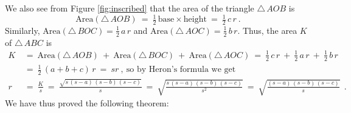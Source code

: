 
We also see from Figure \ref{fig:inscribed} that the area of the triangle $\triangle\,AOB$ is
\begin{displaymath}
 \text{Area}(\triangle\,AOB) ~=~ \tfrac{1}{2}\,\text{base} \times \text{height} ~=~
  \tfrac{1}{2}\,c\,r ~.
\end{displaymath}
Similarly, $\text{Area}(\triangle\,BOC) = \frac{1}{2}\,a\,r$ and
$\text{Area}(\triangle\,AOC) = \frac{1}{2}\,b\,r$.
Thus, the area $K$ of $\triangle\,ABC$ is
\begin{align*}
 K ~&=~ \text{Area}(\triangle\,AOB) ~+~\text{Area}(\triangle\,BOC) ~+~ \text{Area}(\triangle\,AOC)
  ~=~ \tfrac{1}{2}\,c\,r ~+~ \tfrac{1}{2}\,a\,r ~+~ \tfrac{1}{2}\,b\,r\\
 &=~ \tfrac{1}{2}\,(a+b+c)\,r ~=~ sr ~,~\text{so by Heron's formula we get}\\
 r ~&=~ \frac{K}{s} ~=~ \frac{\sqrt{s\,(s-a)\,(s-b)\,(s-c)}}{s} ~=~
  \sqrt{\frac{s\,(s-a)\,(s-b)\,(s-c)}{s^2}} ~=~ \sqrt{\frac{(s-a)\,(s-b)\,(s-c)}{s}} ~~.
\end{align*}
We have thus proved the following theorem:


